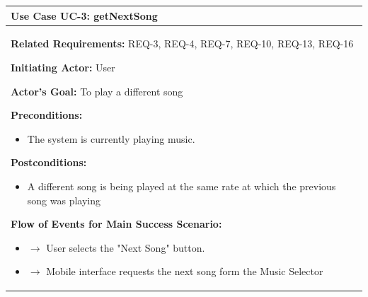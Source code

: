 \documentclass[letterpaper,english, 12pt]{scrreprt}
\begin{document}
\begin{center}
        \begin{tabular}{|C{15cm}|}
                \hline
                        \textbf{Use Case UC-3: getNextSong}\\
                \hline
                        \begin{flushleft}
                                \textbf{Related Requirements: } REQ-3, REQ-4, REQ-7, REQ-10, REQ-13, REQ-16
                        \end{flushleft}
                        \begin{flushleft}
                                \textbf{Initiating Actor: } User
                        \end{flushleft}
                        \begin{flushleft}
                                \textbf{Actor's Goal: } To play a different song
                        \end{flushleft}
                        \begin{flushleft}
                                \textbf{Preconditions: }
                        \end{flushleft}
                                \begin{itemize}
                                        \item The system is currently playing music.
                                \end{itemize}
                        \begin{flushleft}
                                \textbf{Postconditions: }
                        \end{flushleft}
                                \begin{itemize}
                                        \item A different song is being played at the same rate at which the previous song was playing
                                \end{itemize}
                        \begin{flushleft}
                                \textbf{Flow of Events for Main Success Scenario: }
                        \end{flushleft}
                                \begin{itemize}
                                        \item $\rightarrow$ User selects the "Next Song" button.
					\item $\rightarrow$ Mobile interface requests the next song form the Music Selector
					

\end{itemize}
\end{tabular}
\end{center}
\end{document}
